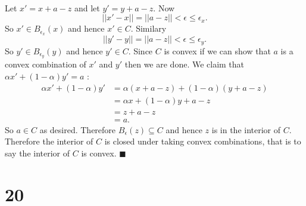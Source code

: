 \documentclass[letterpaper,12pt,oneside,onecolumn]{article}
\begin{document}
\paragraph{}
Let $x' = x + a-z$ and let $y' = y + a - z$. Now $$||x' - x|| = ||a-z|| < \epsilon \leq \epsilon_x.$$ So $x' \in B_{\epsilon_x}(x)$ and hence $x' \in C$. Similary $$||y'-y|| = ||a-z|| < \epsilon \leq \epsilon_y.$$ So $y' \in B_{\epsilon_y}(y)$ and hence $y' \in C$. Since $C$ is convex if we can show that $a$ is a convex combination of $x'$ and $y'$ then we are done. We claim that $\alpha x' + (1-\alpha)y' = a$ :
\begin{align*}
\alpha x' + (1-\alpha)y' &= \alpha(x + a - z) + (1-\alpha)(y+a-z) \\
&= \alpha x + (1-\alpha)y + a - z \\
&= z + a -z \\
&= a.
\end{align*}
So $a \in C$ as desired. Therefore $B_\epsilon(z) \subseteq C$ and hence $z$ is in the interior of $C$. Therefore the interior of $C$ is closed under taking convex combinations, that is to say the interior of $C$ is convex. $\blacksquare$
\section*{20}
\end{document}
